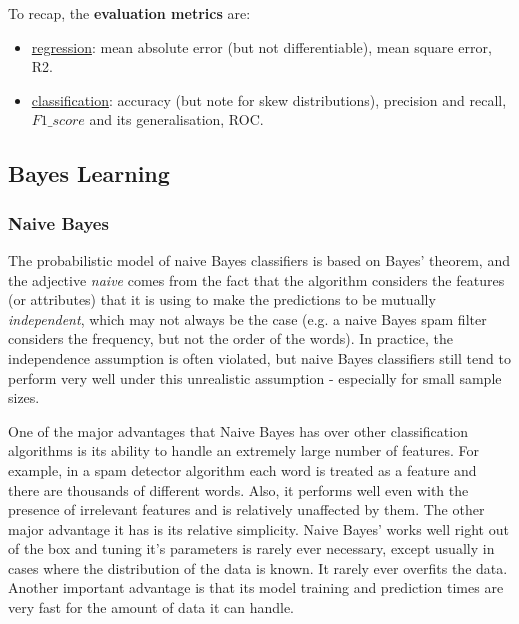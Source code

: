 \documentclass[11pt]{article}
\begin{document}
To recap, the \textbf{evaluation metrics} are:
\begin{itemize}
	\item \underline{regression}: mean absolute error (but not differentiable), mean square error, R2.
	\item \underline{classification}: accuracy (but note for skew distributions), precision and recall, $F1\_score$ and its generalisation, ROC.
\end{itemize}

\subsection{Bayes Learning} \label{Bayes} 

\subsubsection{Naive Bayes}
The probabilistic model of naive Bayes classifiers is based on Bayes' theorem, and the adjective \textit{naive} comes from the fact that the algorithm considers the features (or attributes) that it is using to make the predictions to be mutually \textit{independent}, which may not always be the case (e.g. a naive Bayes spam filter considers the frequency, but not the order of the words). In practice, the independence assumption is often violated, but naive Bayes classifiers still tend to perform very well under this unrealistic assumption - especially for small sample sizes.

One of the major advantages that Naive Bayes has over other classification algorithms is its ability to handle an extremely large number of features. For example, in a spam detector algorithm each word is treated as a feature and there are thousands of different words. Also, it performs well even with the presence of irrelevant features and is relatively unaffected by them. The other major advantage it has is its relative simplicity. Naive Bayes' works well right out of the box and tuning it's parameters is rarely ever necessary, except usually in cases where the distribution of the data is known. It rarely ever overfits the data. Another important advantage is that its model training and prediction times are very fast for the amount of data it can handle. 
\end{document}
